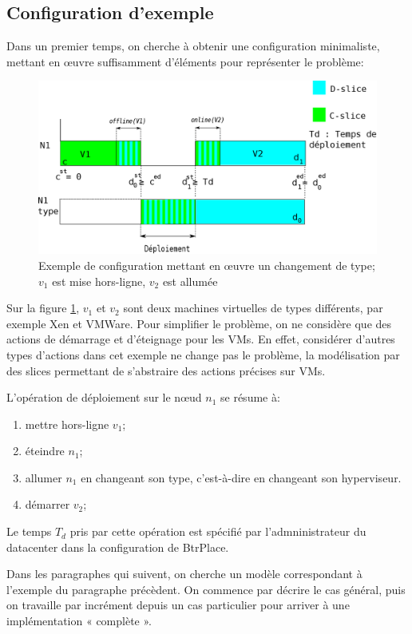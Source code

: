 \documentclass[a4paper]{article}
\begin{document}
\subsection{Configuration d'exemple}
Dans un premier temps, on cherche à obtenir une configuration minimaliste,
mettant en œuvre suffisamment d'éléments pour représenter le problème:
\begin{figure}[!ht]
	\centering
	\includegraphics[scale=.45]{imgs/config.eps}
	\caption{\label{config} Exemple de configuration mettant en œuvre un
		changement de type; $v_1$ est mise hors-ligne, $v_2$ est allumée}
\end{figure}

Sur la figure \ref{config}, $v_1$ et $v_2$ sont deux machines
virtuelles de types différents, par exemple Xen et VMWare.
Pour simplifier le problème, on ne considère que des actions
de démarrage et d'éteignage pour les VMs. En effet, considérer
d'autres types d'actions dans cet exemple ne change pas le
problème, la modélisation par des slices permettant de s'abstraire
des actions précises sur VMs.

L'opération de déploiement sur le nœud $n_1$ se résume à:
\begin{enumerate}
	\item mettre hors-ligne $v_1$;
	\item éteindre $n_1$;
	\item allumer $n_1$ en changeant son type, c'est-à-dire en changeant
		son hyperviseur.
	\item démarrer $v_2$;
\end{enumerate}
Le temps $T_d$ pris par cette opération est spécifié par l'admninistrateur
du datacenter dans la configuration de BtrPlace.

Dans les paragraphes qui suivent, on cherche un modèle correspondant à l'exemple du
paragraphe précèdent. On commence par décrire le cas général, puis on
travaille par incrément depuis un cas particulier pour arriver à une
implémentation « complète ».
\end{document}
